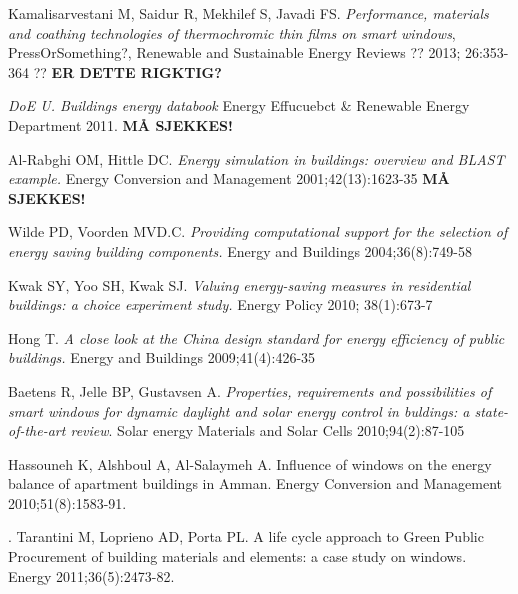 \cite{buildingsEnergyDatabook}
\begin{thebibliography}{9}


      Kamalisarvestani M, Saidur R, Mekhilef S, Javadi FS.
      \emph{Performance, materials and coathing technologies of thermochromic thin films on smart windows}, 
      PressOrSomething?, 
      Renewable and Sustainable Energy Reviews ??
      2013; 26:353-364 ??
      \textbf{ER DETTE RIGKTIG?}

      \emph{DoE U. Buildings energy databook}
      Energy Effucuebct \& Renewable Energy Department 2011.
      \textbf{MÅ SJEKKES!}

      Al-Rabghi OM, Hittle DC.  
      \emph{Energy simulation in buildings: overview and BLAST example.} 
      Energy Conversion and Management 
      2001;42(13):1623-35 
      \textbf{MÅ SJEKKES!}

      Wilde PD, Voorden MVD.C.  
      \emph{Providing computational support for the selection of energy saving building components.} 
      Energy and Buildings 
      2004;36(8):749-58

      Kwak SY, Yoo SH, Kwak SJ.
      \emph{Valuing energy-saving measures in residential buildings: a choice experiment study.}
      Energy Policy
      2010; 38(1):673-7

      Hong T. 
      \emph{A close look at the China design standard for energy efficiency of public buildings.}
      Energy and Buildings
      2009;41(4):426-35

      Baetens R, Jelle BP, Gustavsen A.
      \emph{Properties, requirements and possibilities of smart windows for dynamic daylight and solar energy control in buldings: a state-of-the-art review}.
      Solar energy Materials and Solar Cells
      2010;94(2):87-105

      Hassouneh K, Alshboul A, Al-Salaymeh A.
      Influence of windows on the energy balance of apartment buildings in Amman.
      Energy Conversion and Management 2010;51(8):1583-91.

      .
      Tarantini M, Loprieno AD, Porta PL.
      A life cycle approach to Green Public Procurement of building materials and elements: 
      a case study on windows.
      Energy 2011;36(5):2473-82.


\end{thebibliography}
